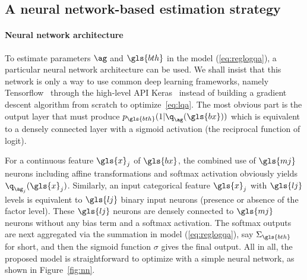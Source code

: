 
\subsection{A neural network-based estimation strategy} \label{sec:estim}

\paragraph{Neural network architecture}

To estimate parameters $\ag$ and $\gls{bth}$ in the model (\ref{eq:reglogqa}), a particular neural network architecture can be used. We shall insist that this network is only a way to use common deep learning frameworks, namely Tensorflow~\cite{tensorflow2015-whitepaper} through the high-level API Keras~\cite{chollet2015keras} instead of building a gradient descent algorithm from scratch to optimize~\eqref{eq:lqa}. The most obvious part is the output layer that must produce $p_{\gls{bth}}(1|\q_{\ag}(\gls{bx}))$ which is equivalent to a densely connected layer with a sigmoid activation (the reciprocal function of logit).

For a continuous feature $\gls{x}_j$ of $\gls{bx}$, the combined use of $\gls{mj}$ neurons including affine transformations and softmax activation obviously yields $\q_{\ag_{j}}(\gls{x}_j)$. Similarly, an input categorical feature $\gls{x}_j$ with $\gls{lj}$ levels is equivalent to $\gls{lj}$ binary input neurons (presence or absence of the factor level). These $\gls{lj}$ neurons are densely connected to $\gls{mj}$ neurons without any bias term and a softmax activation. The softmax outputs are next aggregated via the summation in model (\ref{eq:reglogqa}), say $\Sigma_{\gls{bth}}$ for short, and then the sigmoid function $\sigma$ gives the final output. All in all, the proposed model is straightforward to optimize with a simple neural network, as shown in Figure~\ref{fig:nn}.


\def\layersep{2.5cm}

